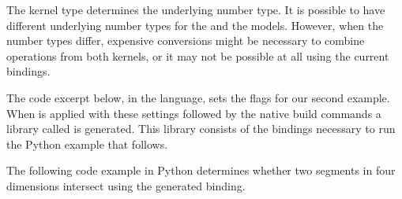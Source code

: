 \begin{table}[!htp]
  \caption{$d$-dimensional Kernel dimension tag options.}
  \centering{}
 \label{tab:kerd:dim}
\end{table}

The kernel type determines the underlying number type. It
is possible to have different underlying number types for the
\iiDandiiiDGeometryKernelPackage{} and the \dDGeometryKernelPackage{}
models. However, when the number types differ, expensive conversions
might be necessary to combine operations from both kernels, or it may
not be possible at all using the current bindings.

The code excerpt below, in the \cmake{} language, sets the \cmake{}
flags for our second example. When  is applied with
these settings followed by the native build commands a library called
 is generated. This library
consists of the bindings necessary to run the Python example that
follows.

The following code example in Python determines whether two segments
in four dimensions intersect using the generated binding.

